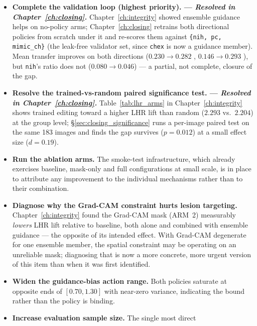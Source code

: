 \begin{itemize}[leftmargin=*]
  \item \textbf{Complete the validation loop (highest priority). ---
        \emph{Resolved in Chapter~\ref{ch:closing}.}} Chapter~\ref{ch:integrity}
        showed ensemble guidance helps on no-policy arms; Chapter~\ref{ch:closing}
        retrains both directional policies from scratch under it and
        re-scores them against \texttt{\{nih, pc, mimic\_ch\}} (the leak-free
        validator set, since \texttt{chex} is now a guidance member). Mean
        transfer improves on both directions ($0.230\to0.282$ \ntop{},
        $0.146\to0.293$ \pton{}), but \texttt{nih}'s \ntop{} ratio does not
        ($0.080\to0.046$) --- a partial, not complete, closure of the gap.
  \item \textbf{Resolve the trained-vs-random paired significance test. ---
        \emph{Resolved in Chapter~\ref{ch:closing}.}}
        Table~\ref{tab:lhr_arms} in Chapter~\ref{ch:integrity} shows trained
        editing toward a higher LHR lift than random ($2.293$ vs.\ $2.204$)
        at the group level; \S\ref{sec:closing_significance} runs a
        per-image paired test on the same 183 images and finds the gap
        survives ($p=0.012$) at a small effect size ($d=0.19$).
  \item \textbf{Run the ablation arms.} The smoke-test infrastructure,
        which already exercises baseline, mask-only and full
        configurations at small scale, is in place to attribute any
        improvement to the individual mechanisms rather than to their
        combination.
  \item \textbf{Diagnose why the Grad-CAM constraint hurts lesion
        targeting.} Chapter~\ref{ch:integrity} found the Grad-CAM mask
        (ARM~2) measurably \emph{lowers} LHR lift relative to baseline,
        both alone and combined with ensemble guidance --- the opposite of
        its intended effect. With Grad-CAM degenerate for one ensemble
        member, the spatial constraint may be operating on an unreliable
        mask; diagnosing that is now a more concrete, more urgent version
        of this item than when it was first identified.
  \item \textbf{Widen the guidance-bias action range.} Both policies
        saturate at opposite ends of $[0.70, 1.30]$ with near-zero
        variance, indicating the bound rather than the policy is binding.
  \item \textbf{Increase evaluation sample size.} The single most direct

\end{itemize}
